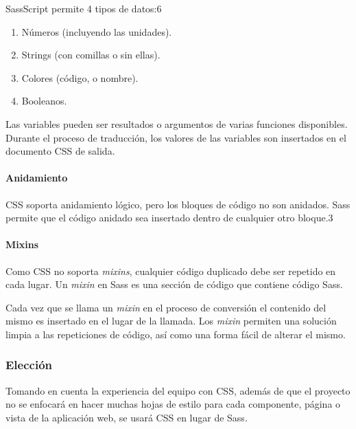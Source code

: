 SassScript permite 4 tipos de datos:6​
\begin{enumerate}
    \item Números (incluyendo las unidades).
    \item Strings (con comillas o sin ellas).
    \item Colores (código, o nombre).
    \item Booleanos.
\end{enumerate}
Las variables pueden ser resultados o argumentos de varias funciones disponibles. Durante el proceso de traducción, los valores de las variables son insertados en el documento CSS de salida.

\paragraph*{Anidamiento}
CSS soporta anidamiento lógico, pero los bloques de código no son anidados. Sass permite que el código anidado sea insertado dentro de cualquier otro bloque.3


\paragraph*{Mixins}

Como CSS no soporta \textit{mixins}, cualquier código duplicado debe ser repetido en cada lugar. Un \textit{mixin} en Sass es una sección de código que contiene código Sass. 


Cada vez que se llama un \textit{mixin} en el proceso de conversión el contenido del mismo es insertado en el lugar de la llamada. Los \textit{mixin} permiten una solución limpia a las repeticiones de código, así como una forma fácil de alterar el mismo.



\subsubsection*{Elección}

Tomando en cuenta la experiencia del equipo con CSS, además de que el proyecto no se enfocará en hacer muchas hojas de estilo para cada componente, página o vista de la aplicación web, se usará CSS en lugar de Sass.